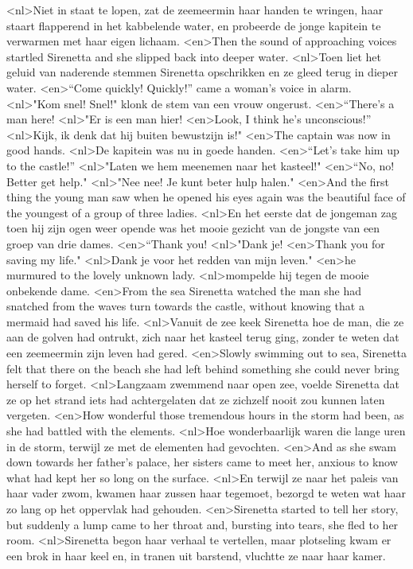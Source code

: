 <nl>Niet in staat te lopen, zat de zeemeermin haar handen te wringen, haar staart flapperend in het kabbelende water, en probeerde de jonge kapitein te verwarmen met haar eigen lichaam.
<en>Then the sound of approaching voices startled Sirenetta and she slipped back into deeper water.
<nl>Toen liet het geluid van naderende stemmen Sirenetta opschrikken en ze gleed terug in dieper water.
<en>“Come quickly! Quickly!” came a woman’s voice in alarm.
<nl>"Kom snel! Snel!" klonk de stem van een vrouw ongerust.
<en>“There’s a man here!
<nl>"Er is een man hier!
<en>Look, I think he’s unconscious!” 
<nl>Kijk, ik denk dat hij buiten bewustzijn is!"
<en>The captain was now in good hands.
<nl>De kapitein was nu in goede handen.
<en>“Let’s take him up to the castle!”
<nl>"Laten we hem meenemen naar het kasteel!"
<en>“No, no! Better get help."
<nl>"Nee nee! Je kunt beter hulp halen."
<en>And the first thing the young man saw when he opened his eyes again was the beautiful face of the youngest of a group of three ladies.
<nl>En het eerste dat de jongeman zag toen hij zijn ogen weer opende was het mooie gezicht van de jongste van een groep van drie dames.
<en>“Thank you!
<nl>"Dank je!
<en>Thank you for saving my life."
<nl>Dank je voor het redden van mijn leven."
<en>he murmured to the lovely unknown lady.
<nl>mompelde hij tegen de mooie onbekende dame.
<en>From the sea Sirenetta watched the man she had snatched from the waves turn towards the castle, without knowing that a mermaid had saved his life.
<nl>Vanuit de zee keek Sirenetta hoe de man, die ze aan de golven had ontrukt, zich naar het kasteel terug ging, zonder te weten dat een zeemeermin zijn leven had gered.
<en>Slowly swimming out to sea, Sirenetta felt that there on the beach she had left behind something she could never bring herself to forget.
<nl>Langzaam zwemmend naar open zee, voelde Sirenetta dat ze op het strand iets had achtergelaten dat ze zichzelf nooit zou kunnen laten vergeten.
<en>How wonderful those tremendous hours in the storm had been, as she had battled with the elements.
<nl>Hoe wonderbaarlijk waren die lange uren in de storm, terwijl ze met de elementen had gevochten.
<en>And as she swam down towards her father’s palace, her sisters came to meet her, anxious to know what had kept her so long on the surface.
<nl>En terwijl ze naar het paleis van haar vader zwom, kwamen haar zussen haar tegemoet, bezorgd te weten wat haar zo lang op het oppervlak had gehouden.
<en>Sirenetta started to tell her story, but suddenly a lump came to her throat and, bursting into tears, she fled to her room.
<nl>Sirenetta begon haar verhaal te vertellen, maar plotseling kwam er een brok in haar keel en, in tranen uit barstend, vluchtte ze naar haar kamer.
